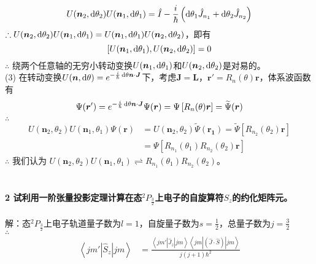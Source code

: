 \documentclass[12pt]{article}
\numberwithin{equation}{section}	 %
\begin{document}
\begin{spacing}{1.5}
\begin{equation}
U(\bm{n}_{2},\mathop{}\!\mathrm{d}\theta_{2})U(\bm{n}_{1},\mathop{}\!\mathrm{d}\theta_{1}) = \hat{I} - \frac{i}{\hbar}\left( \mathop{}\!\mathrm{d}\theta_{1}\hat{J}_{n_{1}} + \mathop{}\!\mathrm{d}\theta_{2}\hat{J}_{n_{2}} \right)
\end{equation}
$\therefore U(\bm{n}_{2},\mathop{}\!\mathrm{d}\theta_{2})U(\bm{n}_{1},\mathop{}\!\mathrm{d}\theta_{1}) = U(\bm{n}_{1},\mathop{}\!\mathrm{d}\theta_{1})U(\bm{n}_{2},\mathop{}\!\mathrm{d}\theta_{2})$，即有
\begin{equation}
\left[U(\bm{n}_{1},\mathop{}\!\mathrm{d}\theta_{1}),U(\bm{n}_{2},\mathop{}\!\mathrm{d}\theta_{2})\right] = 0
\end{equation}
$\therefore$ 绕两个任意轴的无穷小转动变换$U(\bm{n}_{1},\mathop{}\!\mathrm{d}\theta_{1})$和$U(\bm{n}_{2},\mathop{}\!\mathrm{d}\theta_{2})$是对易的。\\
(3) 在转动变换$\displaystyle U(\bm{n},\mathop{}\!\mathrm{d}\theta) = e^{-\frac{i}{\hbar}\mathop{}\!\mathrm{d}\theta\bm{n}\cdot\bm{J}}$下，考虑$\bm{J}=\bm{L}$，$\bm{r}'=R_{n}(\theta)\bm{r}$，体系波函数有
\begin{equation}\nonumber 		%
\Psi(\bm{r}') = e^{-\frac{i}{\hbar}\dif\theta\bm{n}\cdot\bm{J}}\Psi(\bm{r}) = \Psi\left[R_{n}(\theta)\bm{r}\right] =\widetilde\Psi(\bm{r})
\end{equation}		%
$\therefore$ 
\begin{equation}
\begin{aligned}
U(\bm{n}_{2},\theta_{2})U(\bm{n}_{1},\theta_{1})\Psi(\bm{r}) &= U(\bm{n}_{2},\theta_{2})\widetilde\Psi(\bm{r_{1}}) = \widetilde\Psi\left[R_{n_{2}}(\theta_{2})\bm{r}\right] \\
&= \Psi\left[R_{n_{1}}(\theta_{1})R_{n_{2}}(\theta_{2})\bm{r}\right]
\end{aligned}
\end{equation}
$\therefore$ 我们认为 $U(\bm{n}_{2},\theta_{2})U(\bm{n}_{1},\theta_{1}) \rightleftharpoons R_{n_{1}}(\theta_{1})R_{n_{2}}(\theta_{2})$。\\
~\\
~\\
\textbf{2 \quad 试利用一阶张量投影定理计算在态$\displaystyle ^{2}P_{\frac{3}{2}}$上电子的自旋算符$S_{z}$的约化矩阵元。}\\
~\\
解：态$\displaystyle ^{2}P_{\frac{3}{2}}$上电子轨道量子数为$l=1$，自旋量子数为$\displaystyle s=\frac{1}{2}$，总量子数为$\displaystyle j=\frac{3}{2}$\\
$\therefore$
\begin{align*}
\left< jm' \left| \hat{S}_{z} \right| jm \right> &= \frac{\left<jm'\left|\hat{J}_{z}\right|jm\right> \left<jm\left|(\hat{J}\cdot\hat{S})\right|jm\right>}{j(j+1)\hbar^{2}} \\

\end{align*}
\end{spacing}
\end{document}
